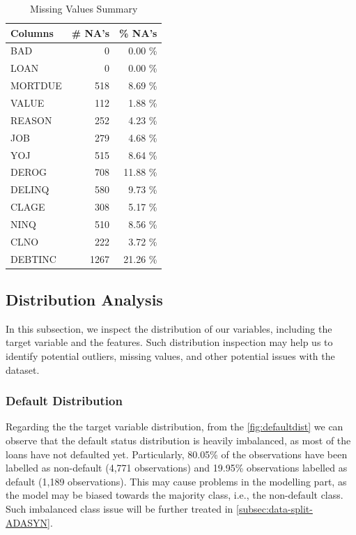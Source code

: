 \begin{table}[H]
\small
\setlength{\tabcolsep}{8pt}
\renewcommand{\arraystretch}{1.3}
\centering
\caption[Missing Values Summary]{Missing Values Summary}\label{tab:natable}
\begin{tabular}{l r r}
\toprule
\textbf{Columns} & \textbf{\# NA's} & \textbf{\% NA's}\\
\midrule
\hline
BAD & 0 & 0.00 \% \\
LOAN & 0 & 0.00 \% \\
MORTDUE & 518 & 8.69 \% \\
VALUE & 112 & 1.88 \% \\
REASON & 252 & 4.23 \% \\
JOB & 279 & 4.68 \% \\
YOJ & 515 & 8.64 \% \\
DEROG & 708 & 11.88 \% \\
DELINQ & 580 & 9.73 \% \\
CLAGE & 308 & 5.17 \% \\
NINQ & 510 & 8.56 \% \\
CLNO & 222 & 3.72 \% \\
DEBTINC & 1267 & 21.26 \% \\
\hline
\bottomrule
\end{tabular}
\vspace{0.35em}

\vspace{-1em}
\end{table}


\subsection{Distribution Analysis}
\label{subsec:distribution}
In this subsection, we inspect the distribution of our variables, including the target variable and the features.
Such distribution inspection may help us to identify potential outliers, missing values, and other potential issues with the dataset.

\subsubsection{Default Distribution}

Regarding the the target variable distribution, from the \autoref{fig:defaultdist} we can observe that the default status distribution is heavily imbalanced, as most of the loans have not defaulted yet.
Particularly, 80.05\% of the observations have been labelled as non-default (4,771 observations) and 19.95\% observations labelled as default (1,189 observations).
This may cause problems in the modelling part, as the model may be biased towards the majority class, i.e., the non-default class. Such imbalanced class issue will be further treated in \autoref{subsec:data-split-ADASYN}.

